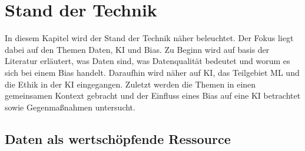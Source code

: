 \chapter{Stand der Technik}
\begin{onehalfspace}  
    \label{sec:theorie/standdertechnik}
        In diesem Kapitel wird der Stand der Technik näher beleuchtet. Der Fokus liegt dabei auf den Themen Daten, \ac{KI} und Bias. Zu Beginn wird auf basis der Literatur erläutert, was Daten sind, was Datenqualität bedeutet und worum es sich bei einem Bias handelt. Daraufhin wird näher auf \ac{KI}, das Teilgebiet \ac{ML} und die Ethik in der \ac{KI} eingegangen. Zuletzt werden die Themen in einen gemeinsamen Kontext gebracht und der Einfluss eines Bias auf eine \ac{KI} betrachtet sowie Gegenmaßnahmen untersucht. 
    
    \section{Daten als wertschöpfende Ressource}
    \label{subsec:datenchapter}

\end{onehalfspace}
